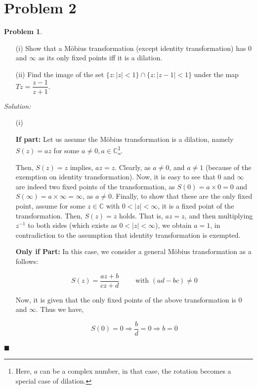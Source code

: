 \documentclass[12pt]{article}
\newcommand{\C}{\mathbb{C}}
\theoremstyle{definition}
\newtheorem*{prb}{Problem}
\newenvironment{problem}{
\begin{tcolorbox}[colback=blue!5!white,colframe=blue!75!black, parbox = true] \begin{prb}  }{\end{prb}\end{tcolorbox} }
\newenvironment{answer}{\textit{Solution: }\quad }{ \hfill $\blacksquare$}
\numberwithin{equation}{section}
\begin{document}
\pagebreak

\section{Problem 2}
\begin{problem}
	\begin{enumerate}
		\item[(i)] Show that a M\"{o}bius transformation (except identity transformation) has $0$ and $\infty$ as its only fixed points iff it is
		a dilation.
		\item[(ii)] Find the image of the set $\{z : |z| < 1\} \cap \{z : |z - 1| < 1\}$ under the map $Tz = \dfrac{z-1}{z+1}$.
	\end{enumerate}
\end{problem}

\begin{answer}
	\begin{enumerate}
		\item[(i)]
		
		\textbf{If part:} Let us assume the M\"{o}bius transformation is a dilation, namely $S(z) = az$ for some $a \neq 0, a\in \C$\footnote{Here, $a$ can be a complex number, in that case, the rotation becomes a special case of dilation.}.

		Then, $S(z) = z$ implies, $az = z$. Clearly, as $a \neq 0$, and $a \neq 1$ (because of the exemption on identity transformation). Now, it is easy to see that $0$ and $\infty$ are indeed two fixed points of the transformation, as $S(0) = a\times 0 = 0$ and $S(\infty) = a \times \infty = \infty$, as $a \neq 0$. Finally, to show that these are the only fixed point, assume for some $z \in \C$ with $0 < \vert z \vert < \infty$, it is a fixed point of the transformation. Then, $S(z) = z$ holds. That is, $az = z$, and then multiplying $z^{-1}$ to both sides (which exists as $0 < \vert z \vert < \infty$), we obtain $a = 1$, in contradiction to the assumption that identity transformation is exempted.

		\textbf{Only if Part:} In this case, we consider a general M\"{o}bius transformation as a follows:

		$$
		S(z) = \dfrac{az + b}{cz + d} \qquad \text{ with } (ad - bc) \neq 0
		$$

		Now, it is given that the only fixed points of the above transformation is $0$ and $\infty$. Thus we have,

		$$
		S(0) = 0 \Rightarrow \dfrac{b}{d} = 0 \Rightarrow b = 0
		$$


\end{enumerate}
\end{answer}
\end{document}
